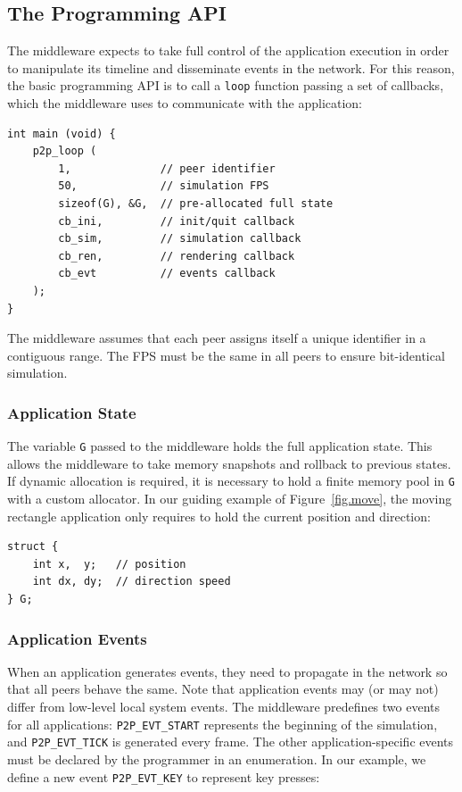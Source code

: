 \documentclass[fleqn,10pt]{SelfArx}
\newcommand{\code}[1]  {\texttt{\footnotesize{#1}}}
\begin{document}
\subsection{The Programming API}
\label{sec.tml.api}

The middleware expects to take full control of the application execution in
order to manipulate its timeline and disseminate events in the network.
For this reason, the basic programming API is to call a \code{loop} function
passing a set of callbacks, which the middleware uses to communicate with the
application:

{\footnotesize
\begin{verbatim}
int main (void) {
    p2p_loop (
        1,              // peer identifier
        50,             // simulation FPS
        sizeof(G), &G,  // pre-allocated full state
        cb_ini,         // init/quit callback
        cb_sim,         // simulation callback
        cb_ren,         // rendering callback
        cb_evt          // events callback
    );
}
\end{verbatim}
}

The middleware assumes that each peer assigns itself a unique identifier in a
contiguous range.
The FPS must be the same in all peers to ensure bit-identical simulation.

\subsubsection{Application State}
\label{sec.tml.api.state}

The variable \code{G} passed to the middleware holds the full application
state.
This allows the middleware to take memory snapshots and rollback to previous
states.
If dynamic allocation is required, it is necessary to hold a finite memory
pool in \code{G} with a custom allocator.
In our guiding example of Figure~\ref{fig.move}, the moving rectangle
application only requires to hold the current position and direction:

{\footnotesize
\begin{verbatim}
struct {
    int x,  y;   // position
    int dx, dy;  // direction speed
} G;
\end{verbatim}
}

\subsubsection{Application Events}
\label{sec.tml.api.events}

When an application generates events, they need to propagate in the network
so that all peers behave the same.
Note that application events may (or may not) differ from low-level local
system events.
%
The middleware predefines two events for all applications:
    \code{P2P\_EVT\_START} represents the beginning of the simulation, and
    \code{P2P\_EVT\_TICK} is generated every frame.
The other application-specific events must be declared by the programmer in an
enumeration.
In our example, we define a new event \code{P2P\_EVT\_KEY} to represent key
presses:
\end{document}
